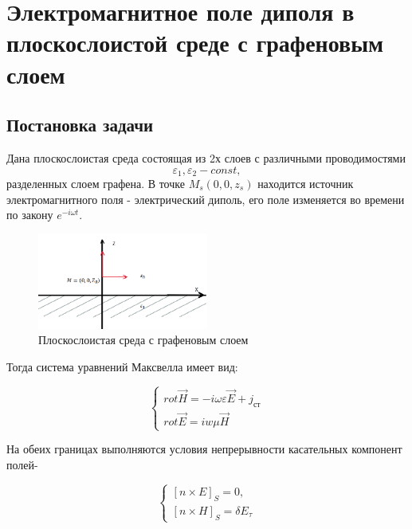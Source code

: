 	\newpage
	
	\section{Электромагнитное поле диполя в плоскослоистой среде с графеновым  слоем}
	
	\subsection{Постановка задачи}
	
	Дана плоскослоистая среда состоящая из 2х слоев с различными проводимостями $$\varepsilon_1, \varepsilon_2 - const, $$разделенных слоем графена. 
	В точке $M_s(0,0,z_s) $ находится источник электромагнитного поля - электрический диполь, его поле изменяется во времени по закону $e^{-i\omega t}$.
	
	\begin{figure}[h] %
		\centering %
		\includegraphics[width=0.5\textwidth]{Рис 6.PNG} %
		\caption{Плоскослоистая среда с графеновым слоем} %
		\label{fig:example6} %
	\end{figure}
	
	Тогда система уравнений Максвелла имеет вид:
	
	
	\begin{equation}
		\begin{cases} rot \vec{H} = -i \omega \varepsilon \vec{E} + j_{ст} \\ rot \vec{E} = iw\mu \vec{H} \end{cases}
	\end{equation}
	
	На обеих границах выполняются условия непрерывности касательных компонент полей-
	
	\begin{equation}
		\begin{cases}
			 [n \times E ]_S = 0, \\
			 [n \times H]_S = \delta E_{\tau} 
		\end{cases}
	\end{equation}
	
